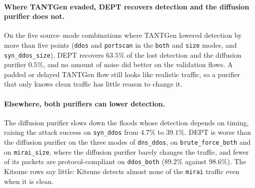 \paragraph{Where TANTGen evaded, DEPT recovers detection and the diffusion purifier does
not.} On the five source--mode combinations where TANTGen lowered detection by more than
five points (\texttt{ddos} and \texttt{portscan} in the \texttt{both} and \texttt{size}
modes, and \texttt{syn\_ddos\_size}), DEPT recovers $63.5\%$ of the lost detection and the
diffusion purifier $0.5\%$, and no amount of noise did better on the validation flows. A
padded or delayed TANTGen flow still looks like realistic traffic, so a purifier that only
knows clean traffic has little reason to change it.

\paragraph{Elsewhere, both purifiers can lower detection.} The diffusion purifier slows down
the floods whose detection depends on timing, raising the attack success on
\texttt{syn\_ddos} from $4.7\%$ to $39.1\%$. DEPT is worse than the diffusion purifier on
the three modes of \texttt{dns\_ddos}, on \texttt{brute\_force\_both} and on
\texttt{mirai\_size}, where the diffusion purifier barely changes the traffic, and fewer of
its packets are protocol-compliant on \texttt{ddos\_both} ($89.2\%$ against $98.6\%$). The
Kitsune rows say little: Kitsune detects almost none of the \texttt{mirai} traffic even
when it is clean.
